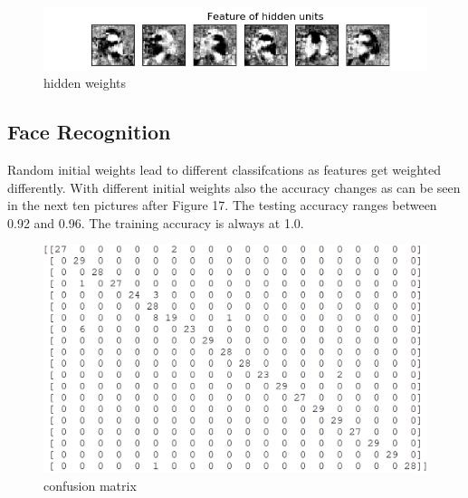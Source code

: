 \begin{figure}[!htbp]
	\centering
        \includegraphics[width=14cm]{2_1_hidden_weights}
	\caption{hidden weights}
\end{figure}

\subsection{Face Recognition}

Random initial weights lead to different classifcations as features get weighted differently. With different initial weights also the accuracy changes as can be seen in the next ten pictures after Figure 17. The testing accuracy ranges between 0.92 and 0.96. The training accuracy is always at 1.0.

\begin{figure}[!htbp]
	\centering
        \includegraphics[width=14cm]{2_2_cfm}
	\caption{confusion matrix}
\end{figure}


